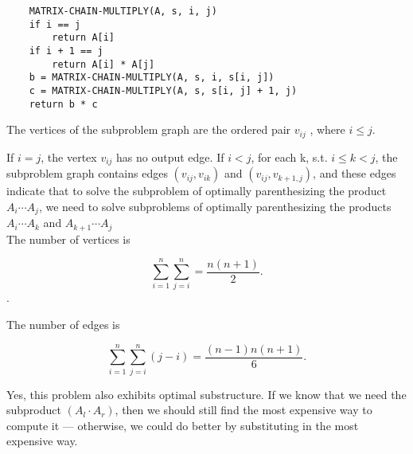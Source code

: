 \documentclass[a4paper, justified]{tufte-handout}
\begin{document}
\begin{problem}[TC 15.2-2]
\end{problem}

\begin{solution}
  \begin{verbatim}
    MATRIX-CHAIN-MULTIPLY(A, s, i, j)
    if i == j
        return A[i]
    if i + 1 == j
        return A[i] * A[j]
    b = MATRIX-CHAIN-MULTIPLY(A, s, i, s[i, j])
    c = MATRIX-CHAIN-MULTIPLY(A, s, s[i, j] + 1, j)
    return b * c

  \end{verbatim}
\end{solution}

\begin{problem}[TC 15.2-4]
\end{problem}

\begin{solution}
  The vertices of the subproblem graph are the ordered pair $v_{ij}$
  , where $i \le j$.

  If $i = j$, the vertex $v_{ij}$ has no output edge.
  If $i < j$, for each k, s.t. $i \le k < j$, the subproblem graph contains edges $(v_{ij}, v_{ik})$ and $(v_{ij}, v_{k+1, j})$, and these edges indicate that to solve the subproblem of optimally parenthesizing the product $A_i \cdots A_j$, we need to solve subproblems of optimally parenthesizing the products $A_i \cdots A_k$ and $A_{k + 1} \cdots A_j$\\
  The number of vertices is

  $$\sum_{i = 1}^n \sum_{j = i}^n = \frac{n(n + 1)}{2}.$$.

  The number of edges is

  $$\sum_{i = 1}^n \sum_{j = i}^n (j - i) = \frac{(n - 1)n(n + 1)}{6}.$$
\end{solution}

\begin{problem}[TC 15.3-3]
\end{problem}

\begin{solution}
  Yes, this problem also exhibits optimal substructure. If we know that we need the subproduct $(A_l \cdot A_r)$, then we should still find the most expensive way to compute it — otherwise, we could do better by substituting in the most expensive way.
\end{solution}

\begin{problem}[TC 15.3-5]
\end{problem}
\end{document}
